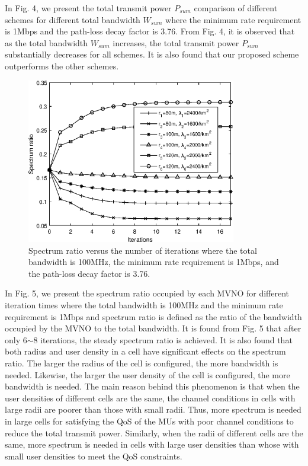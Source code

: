 \documentclass[journal]{IEEEtran}
\begin{document}
In Fig. 4, we present the total transmit power $P_{sum}$ comparison of different schemes for different total bandwidth $W_{sum}$ where the minimum rate requirement is 1Mbps and the path-loss decay factor is 3.76. From Fig. 4, it is observed that as the total bandwidth $W_{sum}$ increases, the total transmit power $P_{sum}$ substantially decreases for all schemes. It is also found that our proposed scheme outperforms the other schemes.

\begin{figure}
	\centering
	\includegraphics[width=3.6in]{SR_convergence.eps}
	\caption{Spectrum ratio versus the number of iterations where the total bandwidth is 100MHz, the minimum rate requirement is 1Mbps, and the path-loss decay factor is 3.76.}
\end{figure}

In Fig. 5, we present the spectrum ratio occupied by each MVNO for different iteration times where the total bandwidth is 100MHz and the minimum rate requirement is 1Mbps and spectrum ratio is defined as the ratio of the bandwidth occupied by the MVNO to the total bandwidth.  It is found from Fig. 5 that after only 6$\sim$8 iterations, the steady spectrum ratio is achieved. It is also found that both radius and user density in a cell have significant effects on the spectrum ratio. The larger the radius of the cell is configured, the more bandwidth is needed. Likewise, the larger the user density of the cell is configured, the more bandwidth is needed. The main reason behind this phenomenon is that when the user densities of different cells are the same, the channel conditions in cells with large radii are poorer than those with small radii. Thus, more spectrum is needed in large cells for satisfying the QoS of the MUs with poor channel conditions to reduce the total transmit power. Similarly, when the radii of different cells are the same, more spectrum is needed in cells with large user densities than whose with small user densities to meet the QoS constraints.
\end{document}
